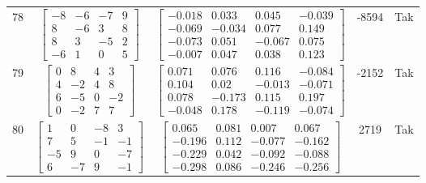 \documentclass[a4paper,12pt]{article}
\begin{document}
\begin{tabular}{c c c c c}
78
&
$\begin{bmatrix} -8 & -6 & -7 & 9 \\ 8 & -6 & 3 & 8 \\ 8 & 3 & -5 & 2 \\ -6 & 1 & 0 & 5 \end{bmatrix}$
&
$\begin{bmatrix} -0.018 & 0.033 & 0.045 & -0.039 \\ -0.069 & -0.034 & 0.077 & 0.149 \\ -0.073 & 0.051 & -0.067 & 0.075 \\ -0.007 & 0.047 & 0.038 & 0.123 \end{bmatrix}$
&
-8594
&
Tak
\\
79
&
$\begin{bmatrix} 0 & 8 & 4 & 3 \\ 4 & -2 & 4 & 8 \\ 6 & -5 & 0 & -2 \\ 0 & -2 & 7 & 7 \end{bmatrix}$
&
$\begin{bmatrix} 0.071 & 0.076 & 0.116 & -0.084 \\ 0.104 & 0.02 & -0.013 & -0.071 \\ 0.078 & -0.173 & 0.115 & 0.197 \\ -0.048 & 0.178 & -0.119 & -0.074 \end{bmatrix}$
&
-2152
&
Tak
\\
80
&
$\begin{bmatrix} 1 & 0 & -8 & 3 \\ 7 & 5 & -1 & -1 \\ -5 & 9 & 0 & -7 \\ 6 & -7 & 9 & -1 \end{bmatrix}$
&
$\begin{bmatrix} 0.065 & 0.081 & 0.007 & 0.067 \\ -0.196 & 0.112 & -0.077 & -0.162 \\ -0.229 & 0.042 & -0.092 & -0.088 \\ -0.298 & 0.086 & -0.246 & -0.256 \end{bmatrix}$
&
2719
&
Tak
\\
\end{tabular} \egroup \newpage
\end{document}
